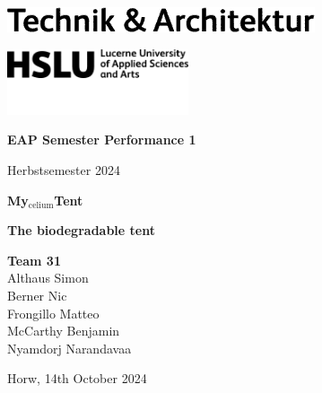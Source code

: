 \documentclass{article}
\begin{document}
\begin{titlepage}
    \begin{flushleft}
        \hspace*{.01cm}
        \includegraphics[width=.3\textwidth]{media/hslu-logo-2.png}

        \vspace*{.01cm}
        \hspace*{.16cm}\includegraphics[width=0.4\textwidth]{media/hslu-svg-logo.png}
    \end{flushleft}

    \vspace*{-.4cm}
    {\huge \textbf{EAP Semester Performance 1}}

    {\Large Herbstsemester 2024}

    \vspace*{3cm}
    \begin{center}
        {\Huge \textbf{My$_{\text{celium}}$Tent}}

        \vspace*{.1cm}
        \textbf{\large The biodegradable tent}

    \end{center}

    \vfill
    {\Large \textbf{Team 31}}\\
    {\large \vspace*{.01cm}
        Althaus Simon\\
        \vspace*{.01cm}
        Berner Nic\\
        \vspace*{.01cm}   
        Frongillo Matteo\\
        \vspace*{.01cm}
        McCarthy Benjamin\\
        \vspace*{.01cm}
        Nyamdorj Narandavaa\\
        \vspace*{.01cm}
    }
    
    \vspace{1cm}
    {\large Horw, 14th October 2024}
\end{titlepage}
\end{document}
